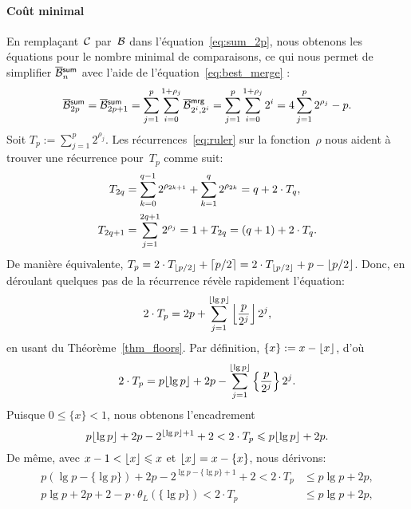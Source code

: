 \paragraph{Coût minimal}

En remplaçant~\(\mathcal{C}\) par~\(\mathcal{B}\) dans
l'équation~\eqref{eq:sum_2p}, nous obtenons les équations pour le
nombre minimal de comparaisons, ce qui nous permet de simplifier
\(\OB{\fun{sum}}{n}\) avec l'aide de
l'équation~\eqref{eq:best_merge} :
\begin{equation}
\OB{\fun{sum}}{2p}
  = \OB{\fun{sum}}{2p+1}
  = \sum_{j=1}^{p}\sum_{i=0}^{1+\rho_{j}}{\OB{\fun{mrg}}{2^i,2^i}}
  = \sum_{j=1}^{p}\sum_{i=0}^{1+\rho_{j}}{2^{i}}
  = 4\sum_{j=1}^{p}{2^{\rho_{j}}} - p.
\label{eq:B_oplus}
\end{equation}
Soit \(T_p := \sum_{j=1}^{p}{2^{\rho_{j}}}\). Les
récurrences~\eqref{eq:ruler}  sur la
fonction~\(\rho\) nous aident à trouver une récurrence pour~\(T_p\)
comme suit:
\begin{align*}
T_{2q} &= \sum_{k=0}^{\smash[t]{q-1}}{2^{\rho_{2k+1}}} +
\sum_{k=1}^{q}{2^{\rho_{2k}}} = q + 2 \cdot T_{q},\\[2mm]
T_{2q+1}
&= \sum_{j=1}^{\smash[t]{2q+1}}{2^{\rho_{j}}} = 1 + T_{2q} = (q + 1) +
2 \cdot T_{q}.
\end{align*}
De manière équivalente, \(T_{p} = 2 \cdot T_{\lfloor{p/2}\rfloor} +
\lceil{p/2}\rceil = 2 \cdot T_{\lfloor{p/2}\rfloor} + p - \lfloor{p/2}\rfloor\). Donc, en
déroulant quelques pas de la récurrence révèle rapidement l'équation:
\begin{equation*}
2 \cdot T_p = 2p + \sum_{j=1}^{\lfloor{\lg p}\rfloor}
            {\left\lfloor{\frac{p}{2^j}}\right\rfloor 2^j},
\end{equation*}
en usant du Théorème~\vref{thm_floors}. Par définition, \(\{x\} := x -
\lfloor{x}\rfloor\), d'où
\begin{equation*}
2 \cdot T_p = p\lfloor{\lg p}\rfloor + 2p - \sum_{j=1}^{\lfloor{\lg
    p}\rfloor}\left\lbrace\frac{p}{2^j}\right\rbrace 2^j.
\end{equation*}
Puisque \(0 \leqslant \{x\} < 1\), nous obtenons l'encadrement
\begin{equation*}
p\lfloor{\lg p}\rfloor + 2p - 2^{\lfloor{\lg p}\rfloor+1} + 2 < 2 \cdot T_p \leqslant
p\lfloor{\lg p}\rfloor + 2p.
\end{equation*}
De même, avec \(x - 1 < \lfloor{x}\rfloor \leqslant x\) et \(\lfloor{x}\rfloor = x -
\{x\}\), nous dérivons:
\begin{align*}
p(\lg p - \{\lg p\}) + 2p - 2^{\lg p - \{\lg p\} +
  1} + 2 < 2 \cdot T_p &\leqslant p\lg p + 2p,\\
p\lg p + 2p + 2 - p \cdot \theta_L(\{\lg p\}) < 2 \cdot T_p
&\leqslant p\lg p + 2p,
\end{align*}
